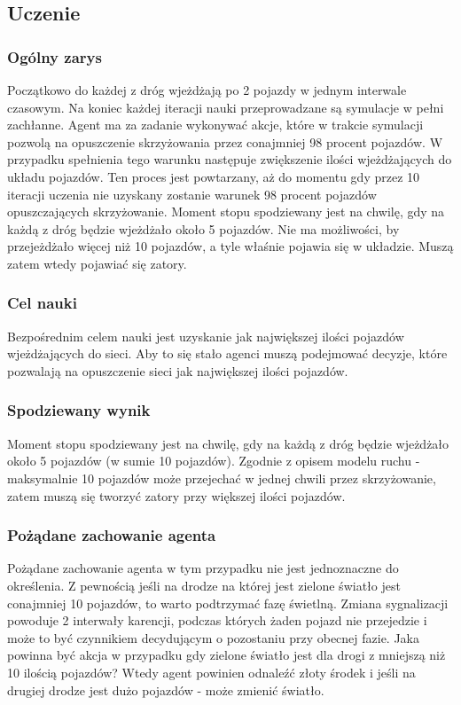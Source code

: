 \documentclass[12pt]{book}
\theoremstyle{plain}
\begin{document}
\subsection{Uczenie}
\subsubsection{Ogólny zarys}
Początkowo do każdej z dróg wjeżdżają po 2 pojazdy w jednym interwale czasowym. Na koniec każdej iteracji nauki przeprowadzane są symulacje w pełni zachłanne. Agent ma za zadanie wykonywać akcje, które w trakcie symulacji pozwolą na opuszczenie skrzyżowania przez conajmniej 98 procent pojazdów. W przypadku spełnienia tego warunku następuje zwiększenie ilości wjeżdżających do układu pojazdów. Ten proces jest powtarzany, aż do momentu gdy przez 10 iteracji uczenia nie uzyskany zostanie warunek 98 procent pojazdów opuszczających skrzyżowanie. Moment stopu spodziewany jest na chwilę, gdy na każdą z dróg będzie wjeżdżało około 5 pojazdów. Nie ma możliwości, by przejeżdżało więcej niż 10 pojazdów, a tyle właśnie pojawia się w układzie. Muszą zatem wtedy pojawiać się zatory.

\subsubsection{Cel nauki}
Bezpośrednim celem nauki jest uzyskanie jak największej ilości pojazdów wjeżdżających do sieci. Aby to się stało agenci muszą podejmować decyzje, które pozwalają na opuszczenie sieci jak największej ilości pojazdów. 
\subsubsection{Spodziewany wynik}
Moment stopu spodziewany jest na chwilę, gdy na każdą z dróg będzie wjeżdżało około 5 pojazdów (w sumie 10 pojazdów). Zgodnie z opisem modelu ruchu - maksymalnie 10 pojazdów może przejechać w jednej chwili przez skrzyżowanie, zatem muszą się tworzyć zatory przy większej ilości pojazdów.
\subsubsection{Pożądane zachowanie agenta}
Pożądane zachowanie agenta w tym przypadku nie jest jednoznaczne do określenia. Z pewnością jeśli na drodze na której jest zielone światło jest conajmniej 10 pojazdów, to warto podtrzymać fazę świetlną. Zmiana sygnalizacji powoduje 2 interwały karencji, podczas których żaden pojazd nie przejedzie i może to być czynnikiem decydującym o pozostaniu przy obecnej fazie. Jaka powinna być akcja w przypadku gdy zielone światło jest dla drogi z mniejszą niż 10 ilością pojazdów? Wtedy agent powinien odnaleźć złoty środek i jeśli na drugiej drodze jest dużo pojazdów - może zmienić światło. 
\end{document}
